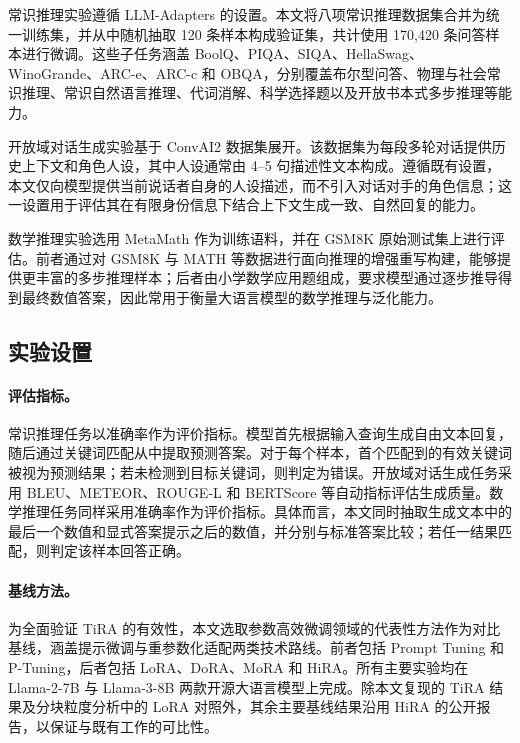 ﻿\documentclass[UTF8,a4paper,11pt]{ctexart}
\begin{document}
常识推理实验遵循 LLM-Adapters\cite{hu2023llmadapters} 的设置。本文将八项常识推理数据集合并为统一训练集，并从中随机抽取 120 条样本构成验证集，共计使用 170,420 条问答样本进行微调。这些子任务涵盖 BoolQ\cite{bisk2019boolq}、PIQA\cite{bisk2020piqa}、SIQA\cite{sap2019socialiqa}、HellaSwag\cite{zellers2019hellaswag}、WinoGrande\cite{sakaguchi2021winogrande}、ARC-e、ARC-c\cite{clark2018arc} 和 OBQA\cite{mihaylov2018openbookqa}，分别覆盖布尔型问答、物理与社会常识推理、常识自然语言推理、代词消解、科学选择题以及开放书本式多步推理等能力。

开放域对话生成实验基于 ConvAI2\cite{dinan2019convai2} 数据集展开。该数据集为每段多轮对话提供历史上下文和角色人设，其中人设通常由 4--5 句描述性文本构成。遵循既有设置，本文仅向模型提供当前说话者自身的人设描述，而不引入对话对手的角色信息；这一设置用于评估其在有限身份信息下结合上下文生成一致、自然回复的能力。

数学推理实验选用 MetaMath\cite{yu2024metamath} 作为训练语料，并在 GSM8K\cite{cobbe2021gsm8k} 原始测试集上进行评估。前者通过对 GSM8K 与 MATH 等数据进行面向推理的增强重写构建，能够提供更丰富的多步推理样本；后者由小学数学应用题组成，要求模型通过逐步推导得到最终数值答案，因此常用于衡量大语言模型的数学推理与泛化能力。

\subsection{实验设置}

\paragraph{评估指标。}
常识推理任务以准确率作为评价指标。模型首先根据输入查询生成自由文本回复，随后通过关键词匹配从中提取预测答案。对于每个样本，首个匹配到的有效关键词被视为预测结果；若未检测到目标关键词，则判定为错误。开放域对话生成任务采用 BLEU\cite{papineni2002bleu}、METEOR\cite{banerjee2005meteor}、ROUGE-L\cite{lin2004rouge} 和 BERTScore\cite{zhang2019bertscore} 等自动指标评估生成质量。数学推理任务同样采用准确率作为评价指标。具体而言，本文同时抽取生成文本中的最后一个数值和显式答案提示之后的数值，并分别与标准答案比较；若任一结果匹配，则判定该样本回答正确。

\paragraph{基线方法。}
为全面验证 TiRA 的有效性，本文选取参数高效微调领域的代表性方法作为对比基线，涵盖提示微调与重参数化适配两类技术路线。前者包括 Prompt Tuning 和 P-Tuning，后者包括 LoRA、DoRA、MoRA 和 HiRA。所有主要实验均在 Llama-2-7B\cite{touvron2023llama2} 与 Llama-3-8B\cite{grattafiori2024llama3} 两款开源大语言模型上完成。除本文复现的 TiRA 结果及分块粒度分析中的 LoRA 对照外，其余主要基线结果沿用 HiRA 的公开报告，以保证与既有工作的可比性。
\end{document}
